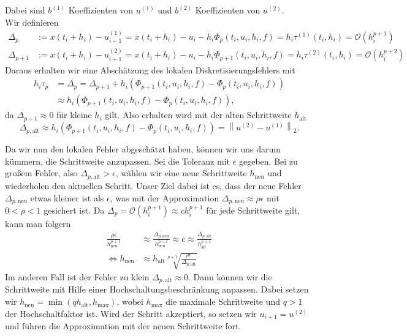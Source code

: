 Dabei sind $b^{(1)}$ Koeffizienten von $u^{(1)}$ und $b^{(2)}$ Koeffizienten von $u^{(2)}$.\\
Wir definieren
\begin{align*}
    \Delta_{p} &:= x(t_i + h_i) - u^{(1)}_{i+1}
    = x(t_i + h_i) - u_i - h_i \Phi_{p}(t_i,u_i,h_i,f)= h_i\tau^{(1)}(t_i,h_i) = \mathcal{O}(h_i^{p+1})\\
    \Delta_{p+1} &:= x(t_i + h_i) - u^{(2)}_{i+1}
    = x(t_i + h_i) - u_i - h_i \Phi_{p+1}(t_i,u_i,h_i,f)= h_i\tau^{(2)}(t_i,h_i)= \mathcal{O}(h_i^{p+2})
\end{align*}
Daraus erhalten wir eine Abschätzung des lokalen Diskretisierungsfehlers mit
\begin{align*}
    h_i\tau_{p} &= \Delta_{p} = \Delta_{p+1} + h_i(\Phi_{p+1}(t_i,u_i,h_i,f) - \Phi_{p}(t_i,u_i,h_i,f)) \\
    &\approx h_i(\Phi_{p+1}(t_i,u_i,h_i,f) - \Phi_{p}(t_i,u_i,h_i,f)),
\end{align*}
da $\Delta_{p+1} \approx 0$ für kleine $h_i$ gilt. Also erhalten wird mit der alten Schrittweite $h_{\text{alt}}$
\[
    \Delta_{p, \text{alt}} \approx h_i(\Phi_{p+1}(t_i,u_i,h_i,f) - \Phi_{p}(t_i,u_i,h_i,f))
    = \left\lVert u^{(2)} - u^{(1)} \right\rVert_2.
\]

Da wir nun den lokalen Fehler abgeschätzt haben, können wir uns darum kümmern, die Schrittweite anzupassen. Sei die
Toleranz mit $\epsilon$ gegeben. Bei zu großem Fehler, also $\Delta_{p, \text{alt}} > \epsilon$, wählen wir eine neue
Schrittweite $h_{\text{neu}}$ und wiederholen den aktuellen Schritt. Unser Ziel dabei ist es, dass der neue Fehler
$\Delta_{p, \text{neu}}$ etwas kleiner ist als $\epsilon$, was mit der Approximation
$\Delta_{p, \text{neu}} \approx \rho \epsilon$ mit $0 < \rho < 1$ gesichert ist. Da
$\Delta_p = \mathcal{O}(h_i^{p+1}) \approx ch_i^{p+1}$ für jede Schrittweite gilt, kann man folgern
\begin{align*}
    \frac{\rho \epsilon}{h_{\text{neu}}^{p+1}}
    &\approx \frac{\Delta_{p, \text{neu}}}{h_{\text{neu}}^{p+1}}
    \approx c
    \approx \frac{\Delta_{p, \text{alt}}}{h_{\text{alt}}^{p+1}}\\
    \Leftrightarrow h_{\text{neu}} &\approx h_{\text{alt}} \sqrt[p+1]{\frac{\rho \epsilon}{\Delta_{p, \text{alt}}}}
\end{align*}
Im anderen Fall ist der Fehler zu klein $\Delta_{p, \text{alt}} \approx 0$. Dann können wir die Schrittweite mit Hilfe
einer Hochschaltungsbeschränkung anpassen. Dabei setzen wir $h_{\text{neu}} = \min(q h_{\text{alt}}, h_{\text{max}})$,
wobei $h_{\text{max}}$ die maximale Schrittweite und $q>1$ der Hochschaltfaktor ist. Wird der Schritt akzeptiert, so
setzen wir $u_{i+1} = u^{(2)}$ und führen die Approximation mit der neuen Schrittweite fort.

